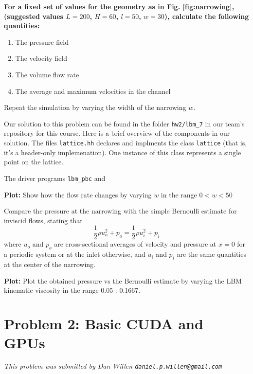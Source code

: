 \documentclass[11pt]{article}
\newcommand{\tty}[1]{\texttt{#1}}
\begin{document}
    
    \textbf{For a fixed set of values for the geometry 
    as in Fig. \ref{fig:narrowing}, (suggested values $L=200$, $H=60$, $l=50$, $w=30$), 
    calculate the following quantities:}
    \begin{enumerate}
      \item The pressure field
      \item The velocity field 
      \item The volume flow rate 
      \item The average and maximum velocities in the channel
    \end{enumerate}

    Repeat the simulation by varying the width of the narrowing $w$.

Our solution to this problem can be found in the folder \tty{hw2/lbm\_7}
in our team's repository for this course.  
Here is a brief overview of the components in our solution.
The files \tty{lattice.hh} declares and implments the class \tty{lattice}
(that is, it's a header-only implemenation).  
One instance of this class represents a single point on the lattice.

The driver programs \tty{lbm\_pbc} and \tty{}

    \textbf{Plot:}
    Show how the flow rate changes by varying $w$ in the range $0<w<50$

    Compare the pressure at the narrowing with the simple Bernoulli estimate for inviscid flows, stating that
    $$
    \frac{1}{2} \rho u_o^2 + p_o = \frac{1}{2} \rho u_i^2 + p_i
    $$
    where $u_o$ and $p_o$ are cross-sectional averages of velocity and pressure at $x=0$ for a periodic system 
    or at the inlet otherwise, and $u_i$ and $p_i$ are the same quantities at the center of the narrowing. 
    
    \textbf{Plot:}
    Plot the obtained pressure vs the Bernoulli estimate by varying the LBM kinematic viscosity in the range 0.05 : 0.1667.

  \section{Problem 2:  Basic CUDA and GPUs}
    \textit{This problem was submitted by Dan Willen \texttt{daniel.p.willen@gmail.com}}
\end{document}

